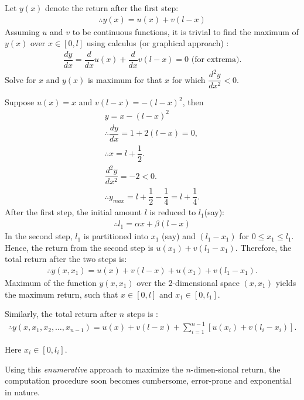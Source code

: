 \begin{s}
Let $y(x)$ denote the return after the first step:
\begin{gather*}
\therefore y(x) = u(x) + v(l - x)
\end{gather*}
Assuming $u$ and $v$ to be continuous functions, it is trivial to find the maximum of $y(x)$ over $x \in [0, l]$ using calculus (or graphical approach) :
\begin{gather*}
\dfrac{d y}{d x} = \dfrac{d}{d x} u(x) + \dfrac{d}{d x} v(l - x) = 0 \text{ (for extrema)}.
\end{gather*}
Solve for $x$ and $y(x)$ is maximum for that $x$ for which $\dfrac{d^2 y}{d x^2} < 0$.

Suppose $u(x) = x$ and $v(l - x) = -(l - x)^2 $, then 
\begin{gather*}
y = x - (l - x)^2 \\
\therefore \dfrac{d y}{d x} = 1 + 2(l - x) = 0, \\
\therefore x = l + \dfrac{1}{2}.\\
\dfrac{d^2 y}{d x^2} = -2 < 0. \\
\therefore y_{max} = l + \dfrac{1}{2} - \dfrac{1}{4} = l + \dfrac{1}{4}. 
\end{gather*}
After the first step, the initial amount $l$ is reduced to $l_1$(say):
\begin{gather*}
\therefore l_1 = \alpha x + \beta (l - x) 
\end{gather*}
In the second step, $l_1$ is partitioned into $x_1$ (say) and $(l_1 - x_1)$ for $0 \le x_1 \le l_1$. Hence, the return from the second step is $u(x_1) + v(l_1 - x_1)$. Therefore, the total return after the two steps is:
\begin{gather*}
\therefore y(x, x_1) = u(x) + v(l - x) + u(x_1) + v(l_1 - x_1).
\end{gather*}
Maximum of the function $y(x, x_1)$ over the 2-dimensional space $(x, x_1)$ yields the maximum return, such that $x \in [0, l]$ and $x_1 \in [0, l_1]$.

Similarly, the total return after $n$ steps is :
\begin{gather}
\therefore y(x, x_1, x_2, \ldots, x_{n - 1}) = u(x) + v(l - x) + \sum_{i=1}^{n - 1}\left[u(x_i) + v(l_i - x_i)\right].
\end{gather}

Here $x_i \in [0, l_i]$.

\vspace{2mm}

Using this \emph{enumerative} approach to maximize the $n$-dimen-sional return, the computation procedure soon becomes cumbersome, error-prone and exponential in nature. 


\end{s}
